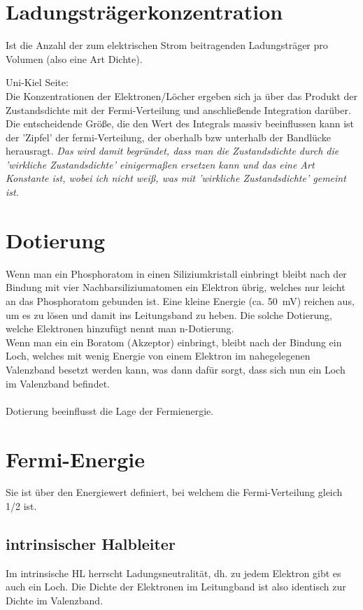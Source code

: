 \documentclass[paper=a4,10pt]{scrartcl}
\begin{document}
\section{Ladungsträgerkonzentration}
\label{sec:carrier_concentration}
Ist die Anzahl der zum elektrischen Strom beitragenden Ladungsträger pro Volumen (also eine Art Dichte).

Uni-Kiel Seite:\\
Die Konzentrationen der Elektronen/Löcher ergeben sich ja über das Produkt der Zustandsdichte mit der Fermi-Verteilung und anschließende Integration darüber. Die entscheidende Größe, die den Wert des Integrals massiv beeinflussen kann ist der 'Zipfel' der fermi-Verteilung, der oberhalb bzw unterhalb der Bandlücke herausragt.
\textit{Das wird damit begründet, dass man die Zustandsdichte durch die 'wirkliche Zustandsdichte' einigermaßen ersetzen kann und das eine Art Konstante ist, wobei ich nicht weiß, was mit 'wirkliche Zustandsdichte' gemeint ist.}


\section{Dotierung}
Wenn man ein Phosphoratom in einen Siliziumkristall einbringt bleibt nach der Bindung mit vier Nachbarsiliziumatomen ein Elektron übrig, welches nur leicht an das Phosphoratom gebunden ist. Eine kleine Energie (ca. \SI{50}{\milli\volt}) reichen aus, um es zu lösen und damit ins Leitungsband zu heben. Die solche Dotierung, welche Elektronen hinzufügt nennt man n-Dotierung.\\
Wenn man ein ein Boratom (Akzeptor) einbringt, bleibt nach der Bindung ein Loch, welches mit wenig Energie von einem Elektron im nahegelegenen Valenzband besetzt werden kann, was dann dafür sorgt, dass sich nun ein Loch im Valenzband befindet.\\\\
Dotierung beeinflusst die Lage der Fermienergie.

\section{Fermi-Energie}
Sie ist über den Energiewert definiert, bei welchem die Fermi-Verteilung gleich 1/2 ist.

\subsection{intrinsischer Halbleiter}
Im intrinsische HL herrscht Ladungsneutralität, dh. zu jedem Elektron gibt es auch ein Loch. Die Dichte der Elektronen im Leitungband ist also identisch zur Dichte im Valenzband.
\end{document}
